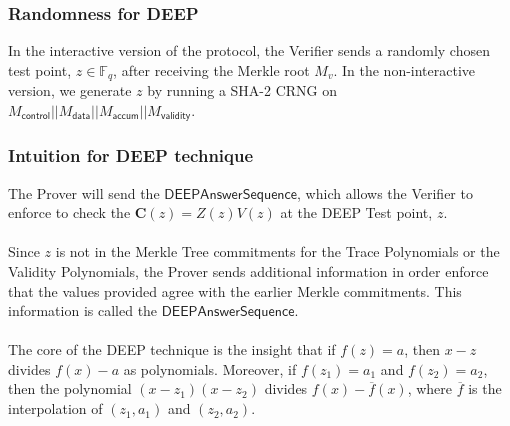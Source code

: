\documentclass[10pt,letterpaper,titlepage]{article}
\newcommand{\GF}[1]{\mathbb{F}_{#1}}
\theoremstyle{definition}
\begin{document}
\begin{appendices}
\subsubsection{Randomness for DEEP}
\label{choose test point}
In the interactive version of the protocol, the Verifier sends a randomly chosen test point, $z\in\GF{q}$, after receiving the Merkle root $M_{v}$.
In the non-interactive version, we generate $z$ by running a SHA-2 CRNG on $M_\mathsf{control}||M_\mathsf{data}||M_\mathsf{accum}||M_\mathsf{validity}$.

\subsubsection{Intuition for DEEP technique}
\label{checking the relation}
\label{necessary evaluations}
The Prover will send the $\mathsf{DEEPAnswerSequence}$, which allows the Verifier to enforce to check the $\mathbf{C}(z)=Z(z)V(z)$ at the DEEP Test point, $z$. \\
\\
Since $z$ is not in the Merkle Tree commitments for the Trace Polynomials or the Validity Polynomials, the Prover sends additional information in order enforce that the values provided agree with the earlier Merkle commitments.
This information is called the $\mathsf{DEEPAnswerSequence}$.\\
\\
The core of the DEEP technique is the insight that if $f(z)=a$, then $x-z$ divides $f(x)-a$ as polynomials.
Moreover, if $f(z_1)=a_1$ and $f(z_2)=a_2$, then the polynomial $(x-z_1)(x-z_2)$ divides $f(x)-\overline{f}(x)$, where $\overline{f}$ is the interpolation of $(z_1,a_1)$ and $(z_2,a_2)$.

\end{appendices}
\end{document}
